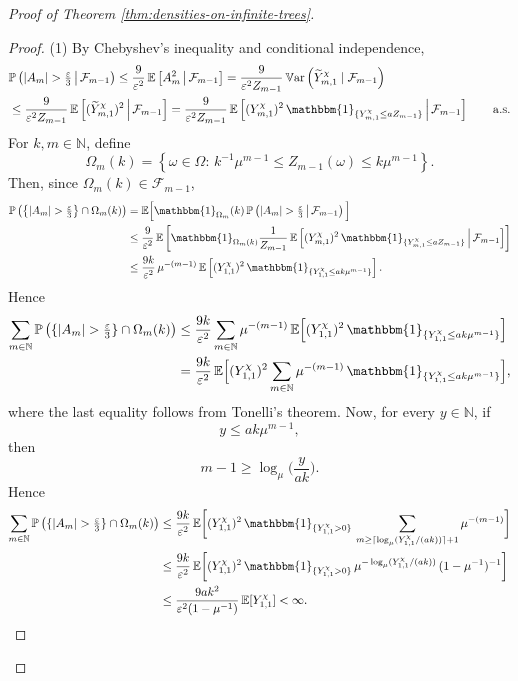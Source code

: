 \documentclass[11pt]{article}
\numberwithin{equation}{section}
\theoremstyle{plain}
\newcommand{\N}{\mathbb N}
\newcommand{\EE}{\mathbb E}
\newcommand{\PP}{\mathbb{P}}
\begin{document}
\begin{proof}[Proof of Theorem \ref{thm:densities-on-infinite-trees}]
\begin{proof}
\medskip\noindent
(1) By Chebyshev's inequality and conditional independence,
\[
\begin{aligned}
&\PP\left( |A_m|>\tfrac{\varepsilon}{3} \,\middle|\, \mathcal{F}_{m-1} \right)
\leq \frac{9}{\varepsilon^2}\, \EE\left[ A_m^2 \,\middle|\, \mathcal{F}_{m-1} \right]
= \frac{9}{\varepsilon^2 Z_{m-1}}\, \mathbb{V}{\rm ar}\left( \widetilde{Y}_{m,1}^{\chi} \mid \mathcal F_{m-1} \right)\\
&\leq \frac{9}{\varepsilon^2 Z_{m-1}}\, \EE\left[ (\widetilde{Y}_{m,1}^{\chi})^2 \,\middle|\, \mathcal{F}_{m-1} \right]
= \frac{9}{\varepsilon^2 Z_{m-1}}\, \EE\left[(Y_{m,1}^{\chi})^2\, \mathbbm{1}_{\{Y_{m,1}^{\chi}\leq aZ_{m-1}\}} 
\,\middle|\, \mathcal{F}_{m-1} \right] \qquad \mathrm{a.s.}
\end{aligned}
\]
For $k,m\in\N$, define
\[
\Omega_{m}(k) = \left\{\omega\in \Omega\colon\, k^{-1}\mu^{m-1}\leq Z_{m-1}(\omega)\leq k\mu^{m-1} \right\}.
\]
Then, since $\Omega_m(k)\in\mathcal F_{m-1}$,
\[
\begin{aligned}
\PP\left( \left\{|A_m|>\tfrac{\varepsilon}{3}\right\}\cap \Omega_{m}(k) \right)
&
=\EE\Big[ \mathbbm{1}_{\Omega_{m}}(k)\, \PP\left(|A_m|>\tfrac{\varepsilon}{3} \,\middle|\, \mathcal{F}_{m-1} \right) \Big]
\\&
\leq \frac{9}{\varepsilon^2}\, \EE\left[ \mathbbm{1}_{\Omega_m(k)}\frac{1}{Z_{m-1}}\, \EE\left[ (Y_{m,1}^{\chi})^2\, \mathbbm{1}_{\{Y_{m,1}^{\chi}\leq aZ_{m-1}\}}
\,\middle|\, \mathcal{F}_{m-1} \right] \right]
\\&
\leq \frac{9k}{\varepsilon^2}\,\mu^{-(m-1)}\, \EE\left[ (Y_{1,1}^{\chi})^2\, \mathbbm{1}_{\{Y_{1,1}^{\chi}\leq ak\mu^{m-1}\}}
\right].
\end{aligned}
\]
Hence
\[
\begin{aligned}
\sum_{m\in\N} \PP\left( \{|A_m|>\tfrac{\varepsilon}{3}\}\cap\Omega_m(k) \right)
&
\leq \frac{9k}{\varepsilon^2} \sum_{m\in\N} \mu^{-(m-1)}\, \EE\Big[ (Y_{1,1}^{\chi})^2\, \mathbbm{1}_{\{Y_{1,1}^{\chi}\le ak\mu^{m-1}\}} \Big]
\\&
= \frac{9k}{\varepsilon^2}\, \EE\Big[ (Y_{1,1}^{\chi})^2 \sum_{m\in\N} \mu^{-(m-1)}\,\mathbbm{1}_{\{Y_{1,1}^{\chi}\le ak\mu^{m-1}\}} \Big],
\end{aligned}
\]
where the last equality follows from Tonelli's theorem. Now, for every $y\in\N$, if
\[
y\leq ak\mu^{m-1},
\]
then
\[
m-1\geq \log_{\mu}\Big(\frac{y}{ak}\Big).
\]
Hence
\[
\begin{aligned}
\sum_{m\in\N} \PP\left( \{|A_m|>\tfrac{\varepsilon}{3}\}\cap\Omega_m(k) \right)
&
\leq \frac{9k}{\varepsilon^2}\,\EE\bigg[ (Y_{1,1}^{\chi})^2\,\mathbbm{1}_{\{Y_{1,1}^{\chi}>0\}}\, \sum_{m\geq \lceil\log_\mu(Y_{1,1}^{\chi}/(ak))\rceil+1} \mu^{-(m-1)}
\bigg]
\\&
\leq \frac{9k}{\varepsilon^2}\, \EE\bigg[ (Y_{1,1}^{\chi})^2\,\mathbbm{1}_{\{Y_{1,1}^{\chi}>0\}}\,  \mu^{-\log_{\mu}(Y_{1,1}^{\chi}/(ak))}\,(1-\mu^{-1})^{-1} \bigg]
\\&
\leq \frac{9ak^2}{\varepsilon^2(1-\mu^{-1})}\, \EE[Y_{1,1}^{\chi}] <\infty.
\end{aligned}
\]


\end{proof}
\end{proof}
\end{document}
